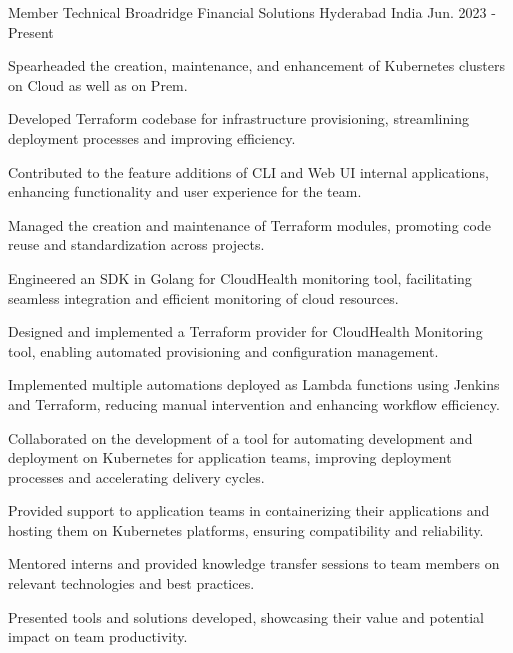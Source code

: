 

\begin{cventries}

  \cventry
    {Member Technical} %
    {Broadridge Financial Solutions} %
    {Hyderabad India} %
    {Jun. 2023 - Present} %
    {
      \begin{cvitems} %
        \item {Spearheaded the creation, maintenance, and enhancement of Kubernetes clusters on Cloud as well as on Prem.}
        \item {Developed Terraform codebase for infrastructure provisioning, streamlining deployment processes and improving efficiency.}
        \item {Contributed to the feature additions of CLI and Web UI internal applications, enhancing functionality and user experience for the team.}
        \item {Managed the creation and maintenance of Terraform modules, promoting code reuse and standardization across projects.}
        \item {Engineered an SDK in Golang for CloudHealth monitoring tool, facilitating seamless integration and efficient monitoring of cloud resources.}
        \item {Designed and implemented a Terraform provider for CloudHealth Monitoring tool, enabling automated provisioning and configuration management.}
        \item {Implemented multiple automations deployed as Lambda functions using Jenkins and Terraform, reducing manual intervention and enhancing workflow efficiency.}
        \item {Collaborated on the development of a tool for automating development and deployment on Kubernetes for application teams, improving deployment processes and accelerating delivery cycles.}
        \item {Provided support to application teams in containerizing their applications and hosting them on Kubernetes platforms, ensuring compatibility and reliability.}
        \item {Mentored interns and provided knowledge transfer sessions to team members on relevant technologies and best practices.}
        \item {Presented tools and solutions developed, showcasing their value and potential impact on team productivity.}
      \end{cvitems}
    }


\end{cventries}
